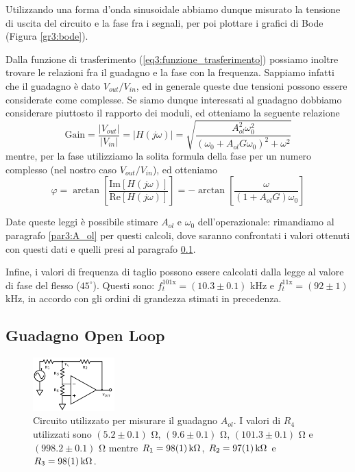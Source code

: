 Utilizzando una forma d'onda sinusoidale abbiamo dunque misurato la tensione di uscita del circuito e la fase fra i segnali, per poi plottare i grafici di Bode (Figura \ref{gr3:bode}).

Dalla funzione di trasferimento (\ref{eq3:funzione_trasferimento}) possiamo inoltre trovare le relazioni fra il guadagno e la fase con la frequenza. Sappiamo infatti che il guadagno è dato $V_{out}/V_{in}$, ed in generale queste due tensioni possono essere considerate come complesse. Se siamo dunque interessati al guadagno dobbiamo considerare piuttosto il rapporto dei moduli, ed otteniamo la seguente relazione
\begin{equation}
\mathrm{Gain}=\frac{|V_{out}|}{|V_{in}|}=|H(j\omega)|=\sqrt{\frac{A_{ol}^2 \omega_0^2}{(\omega_0 + A_{ol} G \omega_0)^2 + \omega^2}}
\label{eq3:fit_gain}
\end{equation}
mentre, per la fase utilizziamo la solita formula della fase per un numero complesso (nel nostro caso $V_{out}/V_{in}$), ed otteniamo
\begin{equation}
\varphi=\arctan\left[{\frac{\mathrm{Im}[H(j\omega)]}{\mathrm{Re}[H(j\omega)]}}\right]= - \arctan\left[\frac{\omega}{(1+A_{ol}G)\omega_0}\right]
\label{eq3:fit_fase}
\end{equation}

Date queste leggi è possibile stimare $A_{ol}$ e $\omega_0$ dell'operazionale: rimandiamo al paragrafo \ref{par3:A_ol} per questi calcoli, dove saranno confrontati i valori ottenuti con questi dati e quelli presi al paragrafo \ref{par3:open}.

Infine, i valori di frequenza di taglio possono essere calcolati dalla legge al valore di fase del flesso ($45^{\circ}$). Questi sono: $f_t^{101\mathrm{x}} = (10.3 \pm 0.1)$ \si{\kHz} e $f_t^{11\mathrm{x}} = (92 \pm 1)$ \si{\kHz}, in accordo con gli ordini di grandezza stimati in precedenza.

\subsection{Guadagno Open Loop}
\label{par3:open}

\begin{figure}
  \begin{center}
    \includegraphics[width=0.280\textwidth]{../E03/latex/LF_ol.pdf}
  \end{center}
  \caption{Circuito utilizzato per misurare il guadagno $A_{ol}$. I valori di $R_4$ utilizzati sono $(5.2\pm 0.1)$ \si{\ohm},  $(9.6\pm0.1)$ \si{\ohm}, $(101.3\pm 0.1)$ \si{\ohm} e $(998.2\pm 0.1)$ \si{\ohm} mentre $R_1=\SI{98\pm1}{\kohm}$, $R_2=\SI{97\pm1}{\kohm}$ e $R_3=\SI{98\pm1}{\kohm}$.}
  \label{cir3:low_frequency}
\end{figure}

